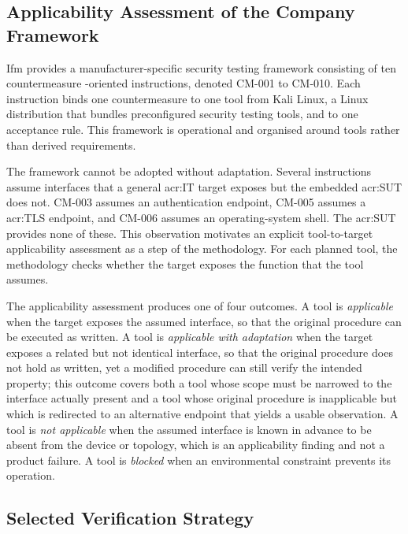 \subsection{Applicability Assessment of the Company Framework} 
\label{subsec:company_framework} 

Ifm provides a manufacturer-specific security testing framework consisting of ten countermeasure -oriented instructions, denoted CM-001 to CM-010. Each instruction binds one countermeasure to one tool from Kali Linux, a Linux distribution that bundles preconfigured security testing tools, and to one acceptance rule. This framework is operational and organised around tools rather than derived requirements. 

The framework cannot be adopted without adaptation. Several instructions assume interfaces that a general \gls{acr:IT} target exposes but the embedded \gls{acr:SUT} does not. CM-003 assumes an authentication endpoint, CM-005 assumes a \gls{acr:TLS} endpoint, and CM-006 assumes an operating-system shell. The \gls{acr:SUT} provides none of these. This observation motivates an explicit tool-to-target applicability assessment as a step of the methodology. For each planned tool, the methodology checks whether the target exposes the function that the tool assumes.

The applicability assessment produces one of four outcomes. A tool is \textit{applicable} when the target exposes the assumed interface, so that the original procedure can be executed as written. A tool is \textit{applicable with adaptation} when the target exposes a related but not identical interface, so that the original procedure does not hold as written, yet a modified procedure can still verify the intended property; this outcome covers both a tool whose scope must be narrowed to the interface actually present and a tool whose original procedure is inapplicable but which is redirected to an alternative endpoint that yields a usable observation. A tool is \textit{not applicable} when the assumed interface is known in advance to be absent from the device or topology, which is an applicability finding and not a product failure. A tool is \textit{blocked} when an environmental constraint prevents its operation. 


\subsection{Selected Verification Strategy} 
\label{subsec:selected_approach} 

